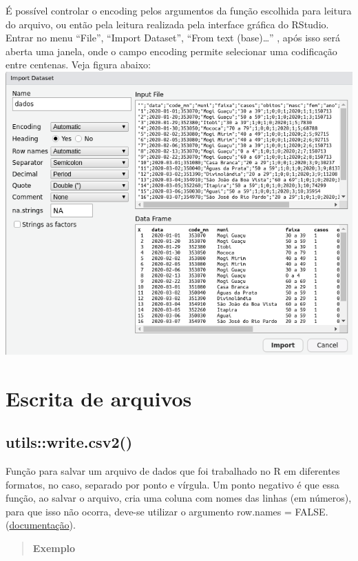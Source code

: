 \documentclass[
]{book}
\theoremstyle{definition}
\theoremstyle{definition}
\theoremstyle{definition}
\theoremstyle{definition}
\theoremstyle{remark}
\begin{document}
É possível controlar o encoding pelos argumentos da função escolhida para leitura do arquivo, ou então pela leitura realizada pela interface gráfica do RStudio. Entrar no menu ``File'', ``Import Dataset'', ``From text (base)\ldots{}'' , após isso será aberta uma janela, onde o campo encoding permite selecionar uma codificação entre centenas. Veja figura abaixo:
\includegraphics{ilustracoes/import_dataset.png}

\hypertarget{escrita-de-arquivos}{%
\section{Escrita de arquivos}\label{escrita-de-arquivos}}

\hypertarget{utilswrite.csv2}{%
\subsection{utils::write.csv2()}\label{utilswrite.csv2}}

Função para salvar um arquivo de dados que foi trabalhado no R em diferentes formatos, no caso, separado por ponto e vírgula. Um ponto negativo é que essa função, ao salvar o arquivo, cria uma coluna com nomes das linhas (em números), para que isso não ocorra, deve-se utilizar o argumento row.names = FALSE. (\href{https://www.rdocumentation.org/packages/utils/versions/3.6.2/topics/write.table}{documentação}).

\begin{quote}
\textbf{Exemplo}
\end{quote}
\end{document}
